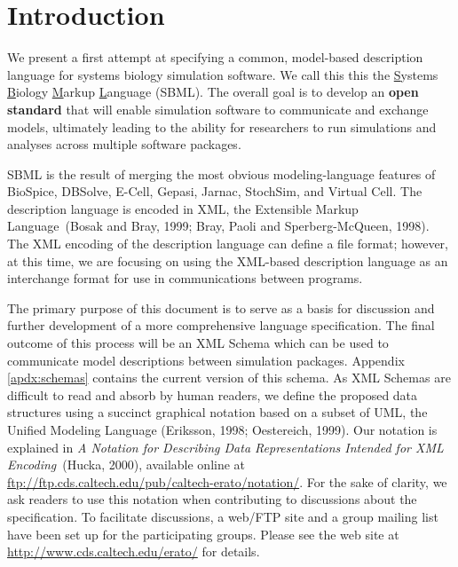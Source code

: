 \documentclass[10pt]{cek-article}
\newcommand{\notationdocloc}{\url{ftp://ftp.cds.caltech.edu/pub/caltech-erato/notation/}}
\newcommand{\eratowebloc}{\url{http://www.cds.caltech.edu/erato/}}
\begin{document}

\setcounter{tocdepth}{2}
\addtolength{\parskip}{-1.2 ex}
\small
\tableofcontents
\normalsize
\addtolength{\parskip}{1.2 ex}            %

\newpage

\section{Introduction}
\label{sec:introduction}

We present a first attempt at specifying a common, model-based
description language for systems biology simulation software.  We
call this this the \underline{S}ystems \underline{B}iology
\underline{M}arkup \underline{L}anguage (SBML).  The overall goal
is to develop an {\bfseries open standard} that will enable
simulation software to communicate and exchange models,
ultimately leading to the ability for researchers to run
simulations and analyses across multiple software packages.

SBML is the result of merging the most obvious modeling-language features
of BioSpice, DBSolve, E-Cell, Gepasi, Jarnac, StochSim, and Virtual Cell.
The description language is encoded in XML, the Extensible Markup
Language~(Bosak and Bray, 1999; Bray, Paoli and Sperberg-McQueen, 1998).
The XML encoding of the description language can define a file format;
however, at this time, we are focusing on using the XML-based description
language as an interchange format for use in communications between
programs.

The primary purpose of this document is to serve as a basis for discussion
and further development of a more comprehensive language specification. The
final outcome of this process will be an XML Schema which can be used to
communicate model descriptions between simulation packages. Appendix
\ref{apdx:schemas} contains the current version of this schema.  As XML
Schemas are difficult to read and absorb by human readers, we define the
proposed data structures using a succinct graphical notation based on a
subset of UML, the Unified Modeling Language (Eriksson, 1998; Oestereich,
1999).  Our notation is explained in \emph{A Notation for Describing Data
  Representations Intended for XML Encoding}~(Hucka, 2000), available
online at \notationdocloc{}.  For the sake of clarity, we ask readers to
use this notation when contributing to discussions about the specification.
To facilitate discussions, a web/FTP site and a group mailing list have
been set up for the participating groups.  Please see the web site at
\eratowebloc{} for details.
\end{document}
